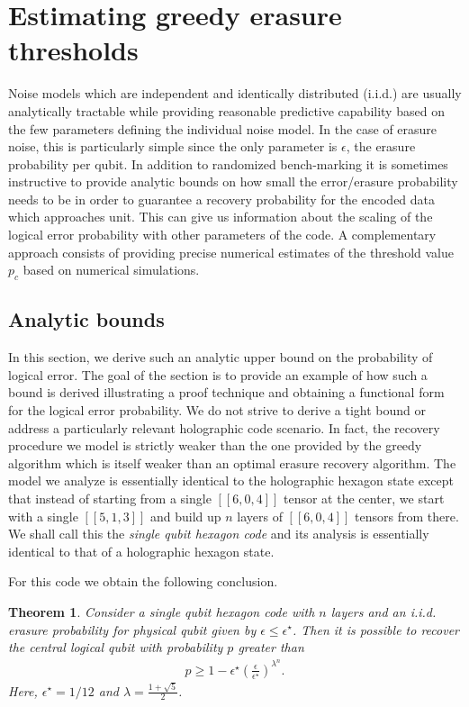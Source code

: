 \documentclass[12pt]{article}
\theoremstyle{plain}
\newtheorem{theorem}{Theorem}
\theoremstyle{plain}
\theoremstyle{plain}
\theoremstyle{plain}
\theoremstyle{result}
\theoremstyle{remark}
\theoremstyle{conjecture}
\theoremstyle{observation}
\theoremstyle{definition}
\theoremstyle{corollary}
\theoremstyle{definition}
\theoremstyle{definition}
\theoremstyle{assumption}
\theoremstyle{definition}
\theoremstyle{problem}
\theoremstyle{fact}
\begin{document}
\section{Estimating greedy erasure thresholds}\label{App:ErasureThreshold}

Noise models which are independent and identically distributed (i.i.d.) are usually analytically tractable while providing reasonable predictive capability based on the few parameters defining the individual noise model.
In the case of erasure noise, this is particularly simple since the only parameter is $\epsilon$, the erasure probability per qubit.
In addition to randomized bench-marking it is sometimes instructive to provide analytic bounds on how small the error/erasure probability needs to be in order to guarantee a recovery probability for the encoded data which approaches unit.
This can give us information about the scaling of the logical error probability with other parameters of the code.
A complementary approach consists of providing precise numerical estimates of the threshold value $p_c$ based on numerical simulations.

\subsection{Analytic bounds}\label{sec:AnalitycBounds}

In this section, we derive such an analytic upper bound on the probability of logical error.
The goal of the section is to provide an example of how such a bound is derived illustrating a proof technique and obtaining a functional form for the logical error probability.
We do not strive to derive a tight bound or address a particularly relevant holographic code scenario.
In fact, the recovery procedure we model is strictly weaker than the one provided by the greedy algorithm which is itself weaker than an optimal erasure recovery algorithm.
The model we analyze is essentially identical to the holographic hexagon state except that instead of starting from a single $[[6,0,4]]$ tensor at the center, we start with a single $[[5,1,3]]$ and build up $n$ layers of $[[6,0,4]]$ tensors from there. 
We shall call this the \emph{single qubit hexagon code} and its analysis is essentially identical to that of a holographic hexagon state.

For this code we obtain the following conclusion.
\begin{theorem} Consider a single qubit hexagon code with $n$ layers and an i.i.d. erasure probability for physical qubit given by $\epsilon \leq \epsilon^\star$.
Then it is possible to recover the central logical qubit with probability $p$ greater than 
\begin{align}
p \geq 1 - \epsilon^\star \left(\frac{\epsilon}{\epsilon^\star}\right)^{\lambda^n}.
\end{align}
Here, $\epsilon^\star = 1/12$ and $\lambda = \frac{1+\sqrt{5}}{2}$.
\end{theorem}
\end{document}
